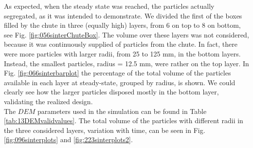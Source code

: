 As expected, when the steady state was reached, the particles actually
segregated, as it was intended to demonstrate.
We divided the first of the boxes
filled by the chute in three (equally high) layers, from 6 on top to 8 
on bottom, see Fig. \ref{fig:056sinterChuteBox}. 
The volume over these layers was not considered, because it was continuously 
supplied of particles from the chute.
In fact, there were more particles with larger radii, from 25 to 125 mm, in the
bottom layers.
Instead, the smallest particles, radius = 12.5 mm, were rather on the top layer. 
In Fig. \ref{fig:066sinterbarplot} the
percentage of the total volume of the particles available in each layer at steady-state, 
grouped by radius, is shown. 
We could clearly see how the larger particles disposed mostly 
in the bottom layer, validating the realized design.\\
The $DEM$ parameters used in the simulation can be found in Table
\ref{tab:13DEMvalidvalues}.
The total volume of the particles with different radii in the three considered
layers, variation with time, can
be seen in Fig. \ref{fig:096sinterplots} and \ref{fig:223sinterplots2}.\\





